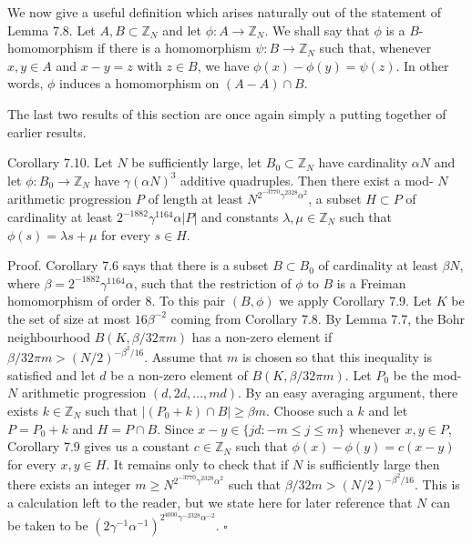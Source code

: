 \documentclass[10pt]{article}
\begin{document}
We now give a useful definition which arises naturally out of the statement of Lemma 7.8. Let $A, B \subset \mathbb{Z}_{N}$ and let $\phi: A \rightarrow \mathbb{Z}_{N}$. We shall say that $\phi$ is a $B$-homomorphism if there is a homomorphism $\psi: B \rightarrow \mathbb{Z}_{N}$ such that, whenever $x, y \in A$ and $x-y=z$ with $z \in B$, we have $\phi(x)-\phi(y)=\psi(z)$. In other words, $\phi$ induces a homomorphism on $(A-A) \cap B$.

The last two results of this section are once again simply a putting together of earlier results.

Corollary 7.10. Let $N$ be sufficiently large, let $B_{0} \subset \mathbb{Z}_{N}$ have cardinality $\alpha N$ and let $\phi: B_{0} \rightarrow \mathbb{Z}_{N}$ have $\gamma(\alpha N)^{3}$ additive quadruples. Then there exist a mod- $N$ arithmetic progression $P$ of length at least $N^{2^{-3770}\gamma^{2328}\alpha^{2}}$, a subset $H \subset P$ of cardinality at least $2^{-1882} \gamma^{1164} \alpha|P|$ and constants $\lambda, \mu \in \mathbb{Z}_{N}$ such that $\phi(s)=\lambda s+\mu$ for every $s \in H$.

Proof. Corollary 7.6 says that there is a subset $B \subset B_{0}$ of cardinality at least $\beta N$, where $\beta=2^{-1882} \gamma^{1164} \alpha$, such that the restriction of $\phi$ to $B$ is a Freiman homomorphism of order 8. To this pair $(B, \phi)$ we apply Corollary 7.9. Let $K$ be the set of size at most $16 \beta^{-2}$ coming from Corollary 7.8. By Lemma 7.7, the Bohr neighbourhood $B(K, \beta / 32 \pi m)$ has a non-zero element if $\beta / 32 \pi m>(N / 2)^{-\beta^{2} / 16}$. Assume that $m$ is chosen so that this inequality is satisfied and let $d$ be a non-zero element of $B(K, \beta / 32 \pi m)$. Let $P_{0}$ be the mod- $N$ arithmetic progression $(d, 2 d, \ldots, m d)$. By an easy averaging argument, there exists $k \in \mathbb{Z}_{N}$ such that $\left|\left(P_{0}+k\right) \cap B\right| \geqslant \beta m$. Choose such a $k$ and let $P=P_{0}+k$ and $H=P \cap B$. Since $x-y \in\{j d:-m \leqslant j \leqslant m\}$ whenever $x, y \in P$, Corollary 7.9 gives us a constant $c \in \mathbb{Z}_{N}$ such that $\phi(x)-\phi(y)=c(x-y)$ for every $x, y \in H$. It remains only to check that if $N$ is sufficiently large then there exists an integer $m \geqslant N^{2^{-3770}\gamma^{2328}\alpha^{2}}$ such that $\beta / 32 m>(N / 2)^{-\beta^{2} / 16}$. This is a calculation left to the reader, but we state here for later reference that $N$ can be taken to be $\left(2 \gamma^{-1} \alpha^{-1}\right)^{2^{4000} \gamma^{-2328} \alpha^{-2}}$. \(\square\)
\end{document}
